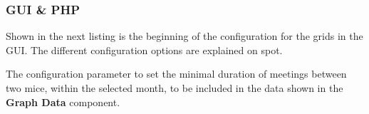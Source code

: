 \documentclass[a4paper,10pt,twoside,headings=small,bibliography=totocnumbered,headsepline]{scrartcl}
\begin{document}
\begin{appendix}
\subsubsection{GUI \& PHP}
\label{app:configfrontend}




Shown in the next listing is the beginning of the configuration for the grids in the GUI. The different configuration options are explained on spot.



The configuration parameter to set the minimal duration of meetings between two mice, within the selected month, to be included in the data shown in the \textbf{Graph Data} component. 



\newpage


\end{appendix}
\end{document}
